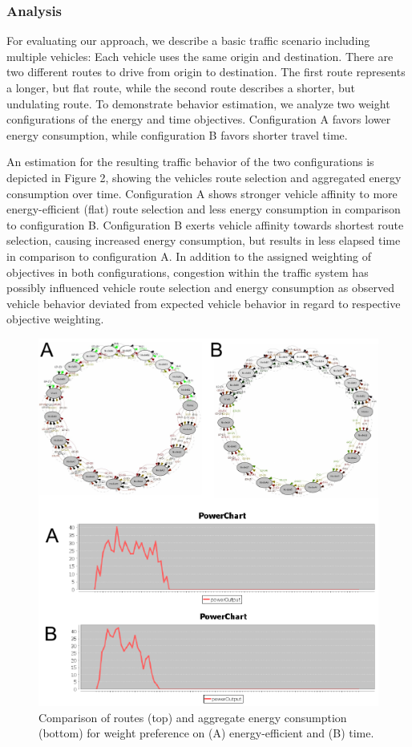 \documentclass[conference]{../cls/IEEEtran}
\begin{document}
\subsubsection*{Analysis}

For evaluating our approach, we describe a basic traffic scenario including multiple vehicles: Each vehicle uses the same origin and destination. There are two different routes to drive from origin to destination. The first route represents a longer, but flat route, while the second route describes a shorter, but undulating route. To demonstrate behavior estimation, we analyze two weight configurations of the energy and time objectives. Configuration A favors lower energy consumption, while configuration B favors shorter travel time.

An estimation for the resulting traffic behavior of the two
configurations is depicted in Figure 2, showing the vehicles route selection
and aggregated energy consumption over time. Configuration A shows
stronger vehicle affinity to more energy-efficient (flat) route selection and
less energy consumption in comparison to configuration B. Configuration B exerts
vehicle affinity towards shortest route selection, causing increased energy
consumption, but results in less elapsed time in comparison to configuration A.
In addition to the assigned weighting of objectives in both configurations,
congestion within the traffic system has possibly influenced vehicle
route selection and energy consumption as observed vehicle behavior deviated
from expected vehicle behavior in regard to respective objective weighting.

\begin{figure}[t!]
	\includegraphics[width=\columnwidth]{../gfx/results.pdf}
	\caption{Comparison of routes (top) and aggregate energy consumption
	(bottom) for weight preference  on (A) energy-efficient and (B) time.}
	\label{figure:results}
\end{figure}
\end{document}
